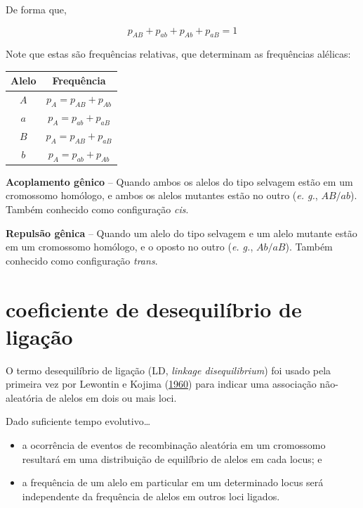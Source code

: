 \documentclass[
]{book}
\begin{document}
De forma que,

\[p_{AB} + p_{ab} + p_{Ab} + p_{aB} = 1\]

Note que estas são frequências relativas, que determinam as frequências alélicas:

\begin{longtable}[]{@{}cc@{}}
\toprule()
Alelo & Frequência \\
\midrule()
\endhead
\(A\) & \(p_{A} = p_{AB} + p_{Ab}\) \\
\(a\) & \(p_{A} = p_{ab} + p_{aB}\) \\
\(B\) & \(p_{A} = p_{AB} + p_{aB}\) \\
\(b\) & \(p_{A} = p_{ab} + p_{Ab}\) \\
\bottomrule()
\end{longtable}

\textbf{Acoplamento gênico} -- Quando ambos os alelos do tipo selvagem estão em um cromossomo homólogo, e ambos os alelos mutantes estão no outro (\emph{e. g.}, \(AB/ab\)). Também conhecido como configuração \emph{cis}.

\textbf{Repulsão gênica} -- Quando um alelo do tipo selvagem e um alelo mutante estão em um cromossomo homólogo, e o oposto no outro (\emph{e. g.}, \(Ab/aB\)). Também conhecido como configuração \emph{trans}.

\hypertarget{coeficiente-de-desequiluxedbrio-de-ligauxe7uxe3o}{%
\section{coeficiente de desequilíbrio de ligação}\label{coeficiente-de-desequiluxedbrio-de-ligauxe7uxe3o}}

O termo desequilíbrio de ligação (LD, \emph{linkage disequilibrium}) foi usado pela primeira vez por Lewontin e Kojima (\href{https://doi.org/10.1111/j.1558-5646.1960.tb03113.x}{1960}) para indicar uma associação não-aleatória de alelos em dois ou mais loci.

Dado suficiente tempo evolutivo\ldots{}

\begin{itemize}
\item
  a ocorrência de eventos de recombinação aleatória em um cromossomo resultará em uma distribuição de equilíbrio de alelos em cada locus; e
\item
  a frequência de um alelo em particular em um determinado locus será independente da frequência de alelos em outros loci ligados.
\end{itemize}
\end{document}
